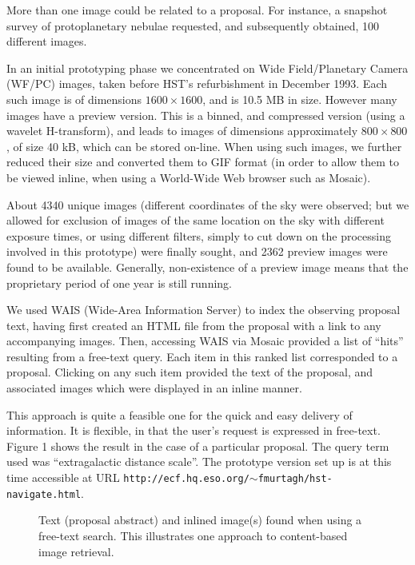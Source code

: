 More than one image could be related to a proposal.  For instance, a 
snapshot survey of 
protoplanetary nebulae requested, and subsequently obtained, 100 different
images.  

In an initial prototyping phase we concentrated on Wide Field/Planetary Camera
(WF/PC) images, taken before HST's refurbishment in December 1993.  Each 
such image is of dimensions $1600 \times 1600$, and is 10.5 MB in size.  
However many images have a preview version.  This is a binned, and compressed
version (using a wavelet H-transform), and leads to images of dimensions 
approximately $800 \times 800$, of size 40 kB, which can be stored on-line.
When using such images, we further reduced their size and converted them to 
GIF format (in order to allow them to be viewed inline, when using a World-Wide
Web browser such as Mosaic).

About 4340 unique images 
(different coordinates of the sky were observed; but we 
allowed for exclusion of images of the same location on the sky with different
exposure times, or using different filters, simply to cut down on the 
processing involved in this prototype) were finally sought, and 
2362 preview images 
were found to be available.  Generally, non-existence of a preview
image means that the proprietary period of one year is still running.  

We used WAIS (Wide-Area Information Server) to index the observing proposal
text, having first created an HTML file from the proposal with a link to any
accompanying images.  Then, accessing WAIS via Mosaic provided a list of 
``hits'' resulting from a free-text query.  Each item in this ranked list
corresponded to a proposal.  Clicking on any such item provided the text of 
the proposal, and associated images which were displayed in an inline manner.

This approach is quite a feasible one for the quick and easy delivery of 
information.  It is flexible, in that the user's request is
expressed in free-text.  Figure 1 shows the result in the case of a particular
proposal.  The query term used was ``extragalactic distance scale''.  The
prototype version set up is at this time accessible at URL
{\tt http://ecf.hq.eso.org/$\sim$fmurtagh/hst-navigate.html}.  

\begin{figure}
\vskip 6cm
\caption{Text (proposal abstract) and inlined image(s) found when using a 
free-text search.  This illustrates 
one approach to content-based image retrieval.}
\end{figure}


